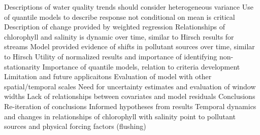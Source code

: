 \documentclass[letterpaper,12pt,oneside]{article}
\begin{document}
\begin{outline}
\3 Descriptions of water quality trends should consider heterogeneous variance
\3 Use of quantile models to describe response not conditional on mean is critical
\2 Description of change provided by weighted regression
\3 Relationships of chlorophyll and salinity is dynamic over time, similar to Hirsch results for streams
\3 Model provided evidence of shifts in pollutant sources over time, similar to Hirsch
\3 Utility of normalized results and importance of identifying non-stationarity
\3 Importance of quantile models, relation to criteria development
\2 Limitation and future applicaitons
\3 Evaluation of model with other spatial/temporal scales
\3 Need for uncertainty estimates and evaluation of window widths
\3 Lack of relationships between covariates and model residuals
\1 Conclusions
\2 Re-iteration of conclusions
\2 Informed hypotheses from results
\3 Temporal dynamics and changes in relationships of chlorophyll with salinity point to pollutant sources and physical forcing factors (flushing)
\end{outline}
\end{document}
